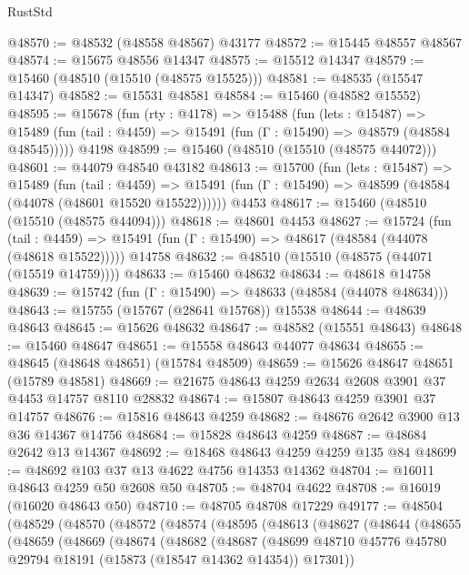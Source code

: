 \begin{lexlean}{RustStd}
\begin{coremodule}
@48570 := @48532 (@48558 @48567) @43177
@48572 := @15445 @48557 @48567
@48574 := @15675 @48556 @14347
@48575 := @15512 @14347
@48579 := @15460 (@48510 (@15510 (@48575 @15525)))
@48581 := @48535 (@15547 @14347)
@48582 := @15531 @48581
@48584 := @15460 (@48582 @15552)
@48595 := @15678
    (fun (rty : @4178) =>
    @15488
      (fun (lets : @15487) =>
      @15489 (fun (tail : @4459) => @15491 (fun (Γ : @15490) => @48579 (@48584 @48545)))))
    @4198
@48599 := @15460 (@48510 (@15510 (@48575 @44072)))
@48601 := @44079 @48540 @43182
@48613 := @15700
    (fun (lets : @15487) =>
    @15489
      (fun (tail : @4459) =>
      @15491 (fun (Γ : @15490) => @48599 (@48584 (@44078 (@48601 @15520 @15522))))))
    @4453
@48617 := @15460 (@48510 (@15510 (@48575 @44094)))
@48618 := @48601 @4453
@48627 := @15724
    (fun (tail : @4459) => @15491 (fun (Γ : @15490) => @48617 (@48584 (@44078 (@48618 @15522)))))
    @14758
@48632 := @48510 (@15510 (@48575 (@44071 (@15519 @14759))))
@48633 := @15460 @48632
@48634 := @48618 @14758
@48639 := @15742 (fun (Γ : @15490) => @48633 (@48584 (@44078 @48634)))
@48643 := @15755 (@15767 (@28641 @15768)) @15538
@48644 := @48639 @48643
@48645 := @15626 @48632
@48647 := @48582 (@15551 @48643)
@48648 := @15460 @48647
@48651 := @15558 @48643 @44077 @48634
@48655 := @48645 (@48648 @48651) (@15784 @48509)
@48659 := @15626 @48647 @48651 (@15789 @48581)
@48669 := @21675 @48643 @4259 @2634 @2608 @3901 @37 @4453 @14757 @8110 @28832
@48674 := @15807 @48643 @4259 @3901 @37 @14757
@48676 := @15816 @48643 @4259
@48682 := @48676 @2642 @3900 @13 @36 @14367 @14756
@48684 := @15828 @48643 @4259
@48687 := @48684 @2642 @13 @14367
@48692 := @18468 @48643 @4259 @4259 @135 @84
@48699 := @48692 @103 @37 @13 @4622 @4756 @14353 @14362
@48704 := @16011 @48643 @4259 @50 @2608 @50
@48705 := @48704 @4622
@48708 := @16019 (@16020 @48643 @50)
@48710 := @48705 @48708 @17229
@49177 := @48504
    (@48529
      (@48570
        (@48572
          (@48574
            (@48595
              (@48613
                (@48627
                  (@48644
                    (@48655
                      (@48659
                        (@48669
                          (@48674
                            (@48682
                              (@48687
                                (@48699
                                  @48710
                                  @45776
                                  @45780
                                  @29794
                                  @18191
                                  (@15873 (@18547 @14362 @14354))
                                  @17301))

\end{coremodule}
\end{lexlean}
